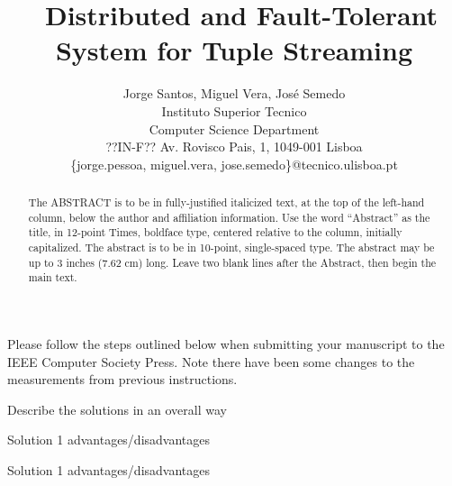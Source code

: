 \documentclass[times, 10pt,twocolumn]{article}
\begin{document}
\title{\ Distributed and Fault-Tolerant System for Tuple
Streaming}

			 \author{Jorge Santos, Miguel Vera, Jos\'e Semedo \\
				 Instituto Superior Tecnico\\ Computer Science
				 Department\\ ??IN-F??  Av. Rovisco Pais, 1,
				 1049-001 Lisboa\\ \{jorge.pessoa, miguel.vera,
				 jose.semedo\}@tecnico.ulisboa.pt }

\maketitle \thispagestyle{empty}

\begin{abstract} The ABSTRACT is to be in fully-justified
	italicized text, at the top of the left-hand column, below
	the author and affiliation information.  Use the word
	``Abstract'' as the title, in 12-point Times, boldface
	type, centered relative to the column, initially
	capitalized. The abstract is to be in 10-point,
	single-spaced type.  The abstract may be up to 3 inches
	(7.62 cm) long. Leave two blank lines after the Abstract,
	then begin the main text.  \end{abstract}




Please follow the steps outlined below when submitting your
manuscript to the IEEE Computer Society Press. Note there
have been some changes to the measurements from previous
instructions. 


Describe the solutions in an overall way


Solution 1 advantages/disadvantages


Solution 1 advantages/disadvantages

\end{document}
